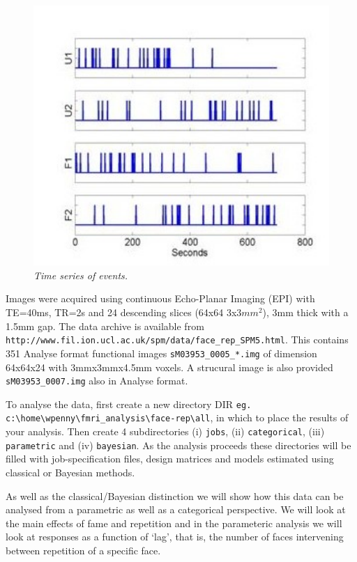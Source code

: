 \begin{figure}
\begin{center}
\includegraphics[width=120mm]{faces/face_timing}
\caption{\em Time series of events. \label{face_timing}}
\end{center}
\end{figure}

Images were acquired using continuous Echo-Planar 
Imaging (EPI) with TE=40ms, TR=2s and 24 descending slices (64x64 3x3$mm^2$), 3mm thick with a 1.5mm gap.
The data archive is available from
 \verb!http://www.fil.ion.ucl.ac.uk/spm/data/face_rep_SPM5.html!.
This contains 351 Analyse format functional images
\verb!sM03953_0005_*.img! of dimension 
64x64x24 with 3mmx3mmx4.5mm voxels. A strucural 
image is also provided \verb!sM03953_0007.img! also in Analyse format.

To analyse the data, first create a new directory DIR 
\newline \verb!eg. c:\home\wpenny\fmri_analysis\face-rep\all!, in which to place the results
of your analysis. Then create 4 subdirectories (i) \verb!jobs!, 
(ii)  \verb!categorical!, (iii)  \verb!parametric! and (iv) \verb!bayesian!. As the analysis 
proceeds these directories will be filled with job-specification files, design matrices 
and models estimated using classical or Bayesian 
methods. 

As well as the classical/Bayesian 
distinction we will show how this 
data can be analysed from a parametric as well as a categorical perspective. We will look at the 
main effects of fame and repetition and in the 
parameteric analysis we will look at 
responses as a function of `lag', that is, the number of faces intervening between repetition of a specific face.

